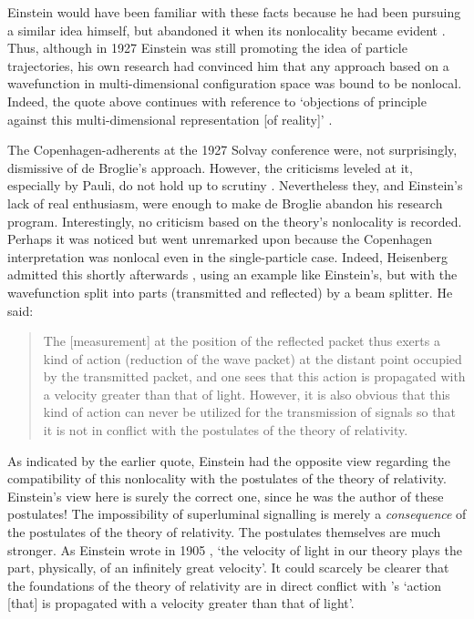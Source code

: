 \documentclass[12pt]{iopart}
\begin{document}
Einstein would have been familiar with these facts because he had been pursuing a similar idea himself, but abandoned it when its nonlocality became evident \cite{Cus94,Bel97}. 
Thus, although in 1927 Einstein was still promoting the idea of particle trajectories, his own research had convinced him that any approach based on a wavefunction in multi-dimensional configuration space was bound to be nonlocal. 
Indeed, the quote above continues with reference to  `objections of principle against this multi-dimensional representation [of reality]' \cite{Bel97}. 

The Copenhagen-adherents  at the 1927 Solvay conference were, not surprisingly, 
dismissive of de Broglie's approach. However, the criticisms leveled at it, especially by Pauli, 
do not hold up to scrutiny \cite{Val01}. Nevertheless they, and Einstein's lack of real enthusiasm, were enough to make de Broglie abandon his research program. Interestingly, no criticism based
on the theory's nonlocality is recorded. Perhaps it was noticed but went unremarked upon because the Copenhagen interpretation was nonlocal even in the single-particle case. Indeed, Heisenberg admitted this shortly afterwards \cite{Hei30}, using an example like Einstein's, but with the wavefunction split into parts (transmitted and reflected) by a beam splitter. He said:
\begin{quote}
The [measurement] at the
position of the reflected packet thus exerts a
kind of action (reduction of the wave packet)
at the distant point occupied by the transmitted
packet, and one sees that this action is
propagated with a velocity greater than that
of light. However, it is also obvious that this kind of action can
never be utilized for the transmission of signals so that
it is not in conflict with the postulates of the theory of
relativity.
\end{quote}

As indicated by the earlier quote, Einstein had the opposite view regarding the compatibility of this nonlocality with the postulates of the theory of relativity. Einstein's view here is surely the correct one, since he was the author of these postulates!  The impossibility of superluminal signalling is merely a {\em consequence} of the postulates of the theory of relativity. The postulates themselves are much stronger. As Einstein wrote in 1905  \cite{Ein05}, 
`the velocity of light in our theory plays the part,
physically, of an infinitely great velocity'. It could scarcely be clearer that 
the foundations of the  theory of relativity are in direct conflict with \hei's `action [that] is
propagated with a velocity greater than that of light'. 
\end{document}
